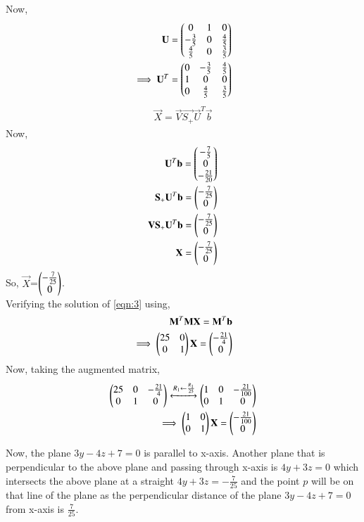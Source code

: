 \documentclass[journal,12pt,twocolumn]{IEEEtran}
\begin{document}
Now,
\begin{align}
\mathbf{U} = \begin{pmatrix}0 & 1 & 0\\-\frac{3}{5} & 0 & \frac{4}{5}\\\frac{4}{5} & 0 & \frac{3}{5}\end{pmatrix}\\
\implies \mathbf{U}^T = \begin{pmatrix}0 & -\frac{3}{5} & \frac{4}{5}\\1 & 0 & 0\\0 & \frac{4}{5} & \frac{3}{5}\end{pmatrix}\\
\end{align}
\begin{align}
\vec{X} = \vec{V} \vec{S_+} \vec{U}^T \vec{b}
\end{align}
Now,
\begin{align}
\mathbf{U}^T \mathbf{b} = \begin{pmatrix}-\frac{7}{5}\\0\\-\frac{21}{20}\end{pmatrix}\\
\mathbf{S_+} \mathbf{U}^T \mathbf{b} = \begin{pmatrix}-\frac{7}{25}\\ 0\end{pmatrix}\\
\mathbf{V} \mathbf{S_+} \mathbf{U}^T \mathbf{b} = \begin{pmatrix}-\frac{7}{25}\\ 0\end{pmatrix}\\
\mathbf{X}= \begin{pmatrix}-\frac{7}{25}\\ 0\end{pmatrix}
\label{eqn:3}
\end{align}
So, $\vec{X}$=$\begin{pmatrix}-\frac{7}{25}\\ 0\end{pmatrix}$.\\
Verifying the solution of \ref{eqn:3} using,
\begin{align}
\mathbf{M}^T \mathbf{M} \mathbf{X} = \mathbf{M}^T \mathbf{b}\\
\implies \begin{pmatrix}25 & 0\\0 & 1\end{pmatrix}\mathbf{X} = \begin{pmatrix}-\frac{21}{4}\\ 0\end{pmatrix}
\end{align}
Now, taking the augmented matrix,
\begin{align}
\begin{pmatrix}25 & 0 & -\frac{21}{4}\\0 & 1 & 0\end{pmatrix} \xleftrightarrow[]{R_1\leftarrow \frac{R_1}{25}}\begin{pmatrix}1 & 0 & -\frac{21}{100}\\0 & 1 & 0\end{pmatrix}\\
\implies \begin{pmatrix}1 & 0\\0 & 1\end{pmatrix}\mathbf{X}=\begin{pmatrix}-\frac{21}{100}\\0\end{pmatrix}
\end{align}

Now, the plane $3y-4z+7 =0$ is parallel to x-axis. Another plane that is perpendicular to the above plane and passing through x-axis is $4y+3z=0$ which intersects the above plane at a straight $4y+3z=-\frac{7}{25}$ and the point $p$ will be on that line of the plane as the perpendicular distance of the plane $3y-4z+7 =0$ from x-axis is $\frac{7}{25}$.
\end{document}
